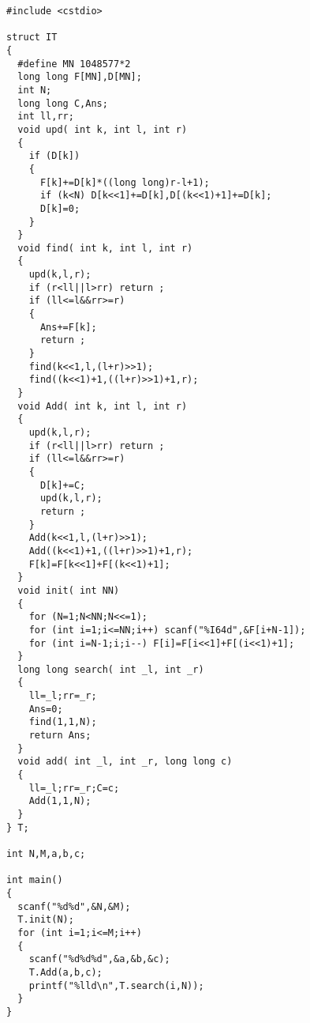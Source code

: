 \begin{lstlisting}[language={}]
#include <cstdio>

struct IT
{
  #define MN 1048577*2
  long long F[MN],D[MN];
  int N;
  long long C,Ans;
  int ll,rr;
  void upd( int k, int l, int r)
  {
    if (D[k])
    {
      F[k]+=D[k]*((long long)r-l+1);
      if (k<N) D[k<<1]+=D[k],D[(k<<1)+1]+=D[k];
      D[k]=0;
    }
  }
  void find( int k, int l, int r)
  {
    upd(k,l,r);
    if (r<ll||l>rr) return ;
    if (ll<=l&&rr>=r)
    {
      Ans+=F[k];
      return ;
    }
    find(k<<1,l,(l+r)>>1);
    find((k<<1)+1,((l+r)>>1)+1,r);
  }
  void Add( int k, int l, int r)
  {
    upd(k,l,r);
    if (r<ll||l>rr) return ;
    if (ll<=l&&rr>=r)
    {
      D[k]+=C;
      upd(k,l,r);
      return ;
    }
    Add(k<<1,l,(l+r)>>1);
    Add((k<<1)+1,((l+r)>>1)+1,r);
    F[k]=F[k<<1]+F[(k<<1)+1];
  }
  void init( int NN)
  {
    for (N=1;N<NN;N<<=1);
    for (int i=1;i<=NN;i++) scanf("%I64d",&F[i+N-1]);
    for (int i=N-1;i;i--) F[i]=F[i<<1]+F[(i<<1)+1];
  }
  long long search( int _l, int _r)
  {
    ll=_l;rr=_r;
    Ans=0;
    find(1,1,N);
    return Ans;
  }
  void add( int _l, int _r, long long c)
  {
    ll=_l;rr=_r;C=c;
    Add(1,1,N);
  }
} T;

int N,M,a,b,c;

int main()
{
  scanf("%d%d",&N,&M);
  T.init(N);
  for (int i=1;i<=M;i++)
  {
    scanf("%d%d%d",&a,&b,&c);
    T.Add(a,b,c);
    printf("%lld\n",T.search(i,N));
  }
}
\end{lstlisting}
